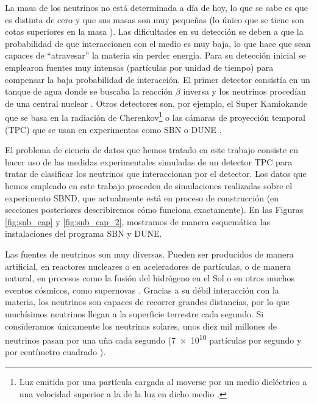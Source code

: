 \documentclass[a4paper,12pt,oneside,titlepage]{book}
\begin{document}
La masa de los neutrinos no está determinada a día de hoy, lo que se sabe es que es distinta de cero y que sus masas son muy pequeñas (lo único que se tiene son cotas superiores en la masa \cite{neutrino_mass}). Las dificultades en su detección se deben a que la probabilidad de que interaccionen con el medio es muy baja, lo que hace que sean capaces de ``atravesar'' la materia sin perder energía. Para su detección inicial se emplearon fuentes muy intensas (partículas por unidad de tiempo) para compensar la baja probabilidad de interacción. El primer detector consistía en un tanque de agua donde se buscaba la reacción $\beta$ inversa y los neutrinos procedían de una central nuclear \cite{particle_griff}. Otros detectores son, por ejemplo, el Super Kamiokande \cite{kamiokande} que se basa en la radiación de Cherenkov\footnote{Luz emitida por una partícula cargada al moverse por un medio dieléctrico a una velocidad superior a la de la luz en dicho medio \cite{jackson}.} o las cámaras de proyección temporal (TPC) que se usan en experimentos como SBN \cite{sbnd} o DUNE \cite{dune}. 

El problema de ciencia de datos que hemos tratado en este trabajo consiste en hacer uso de las medidas experimentales simuladas de un detector TPC para tratar de clasificar los neutrinos que interaccionan por el detector. Los datos que hemos empleado en este trabajo proceden de simulaciones realizadas sobre el experimento SBND, que actualmente está en proceso de construcción (en secciones posteriores describiremos cómo funciona exactamente). En las Figuras \ref{fig:snb_cap} y \ref{fig:snb_cap_2}, mostramos de manera esquemática las instalaciones del programa SBN y DUNE.

Las fuentes de neutrinos son muy diversas. Pueden ser producidos de manera artificial, en reactores nucleares o en aceleradores de partículas, o de manera natural, en procesos como la fusión del hidrógeno en el Sol o en otros muchos eventos cósmicos, como supernovas \cite{supernova}. Gracias a su débil interacción con la materia, los neutrinos son capaces de recorrer grandes distancias, por lo que muchísimos neutrinos llegan a la superficie terrestre cada segundo. Si consideramos únicamente los neutrinos solares, unos diez mil millones de neutrinos pasan por una uña cada segundo (\SI{7e10}{} partículas por segundo y por centímetro cuadrado \cite{flux_neu}).
\end{document}
